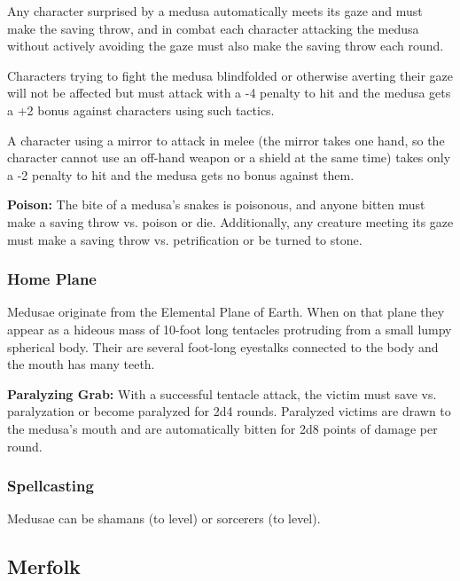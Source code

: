 \begin{multicols*}{2}
Any character surprised by a medusa automatically meets its gaze and must make the saving throw, and in combat each character attacking the medusa without actively avoiding the gaze must also make the saving throw each round.

Characters trying to fight the medusa blindfolded or otherwise averting their gaze will not be affected but must attack with a -4 penalty to hit and the medusa gets a +2 bonus against characters using such tactics.

A character using a mirror to attack in melee (the mirror takes one hand, so the character cannot use an off-hand weapon or a shield at the same time) takes only a -2 penalty to hit and the medusa gets no bonus against them.

\textbf{Poison:} The bite of a medusa’s snakes is poisonous, and anyone bitten must make a saving throw vs. poison or die. Additionally, any creature meeting its gaze must make a saving throw vs. petrification or be turned to stone.

\subsubsection{Home Plane}
Medusae originate from the Elemental Plane of Earth. When on that plane they appear as a hideous mass of 10-foot long tentacles protruding from a small lumpy spherical body. Their are several foot-long eyestalks connected to the body and the mouth has many teeth.

\textbf{Paralyzing Grab:} With a successful tentacle attack, the victim must save vs. paralyzation or become paralyzed for 2d4 rounds. Paralyzed victims are drawn to the medusa's mouth and are automatically bitten for 2d8 points of damage per round.

\subsubsection{Spellcasting}
Medusae can be shamans (to  level) or sorcerers (to  level).

\subsection{Merfolk}
\end{multicols*}
